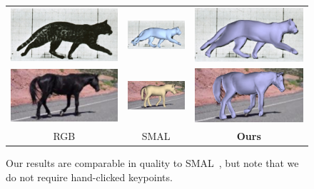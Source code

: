   \begin{figure}[t]
  \def\bb{\rule{2in}{0pt}\rule{0pt}{1in}}
  \def\bjb{\rule{0.5in}{0pt}\rule{0pt}{0.25in}}
  \setlength{\fboxsep}{0pt}%
  \centering
  \begin{tabular}{ccc}
  \includegraphics[width=0.3\linewidth]{smal_comp_cat/rgb_cropped.jpg}
  &
  \includegraphics[width=0.3\linewidth]{smal_comp_cat/muybridge_107_smal_res_cropped.jpg}
  &
  \includegraphics[width=0.3\linewidth]{smal_comp_cat/3d_fit_overlay_rgb_cropped.jpg}
  \\
  
  \includegraphics[width=0.3\linewidth]{smal_comp_horse/rgb_cropped.jpg} &
  \includegraphics[width=0.3\linewidth]{smal_comp_horse/00049424_ferrari_smal_cropped.jpg} &
  
  \includegraphics[width=0.3\linewidth]{smal_comp_horse/3d_fit_overlay_rgb_cropped.jpg} \\
  
  RGB & SMAL \cite{zuffi2017menagerie} & \textbf{Ours}
  \end{tabular}
  \caption{Our results are comparable in quality to SMAL~\cite{zuffi2017menagerie}, but note that we do not require hand-clicked keypoints.
  }
  \label{fig:compar_smal}
  \end{figure}
  
